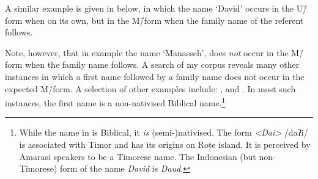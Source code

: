 A similar example is given in  below,
in which the name  `David' occurs in the U\=/form
when on its own, but in the M\=/form when the family name of the referent follows.

\begin{exe}
	\label{ex:130907-5}
\end{exe}

Note, however, that in example 
the name  `Manasseh',
does \emph{not} occur in the M\=/form when the family name  follows.
A search of my corpus reveals many other instances in which a first name followed
by a family name does not occur in the expected M\=/form.
A selection of other examples include: ,  and .
In most such instances, the first name is a non-nativised Biblical name.\footnote{
		While the name  in  is Biblical, it \emph{is} (semi-)nativised.
		The form \emph{<Da{\Q}i>} /daʔi/ is associated with Timor
		and has its origins on Rote island.
		It is perceived by Amarasi speakers to be a Timorese name.
		The Indonesian (but non-Timorese) form of the name \emph{David} is \emph{Daud}.}